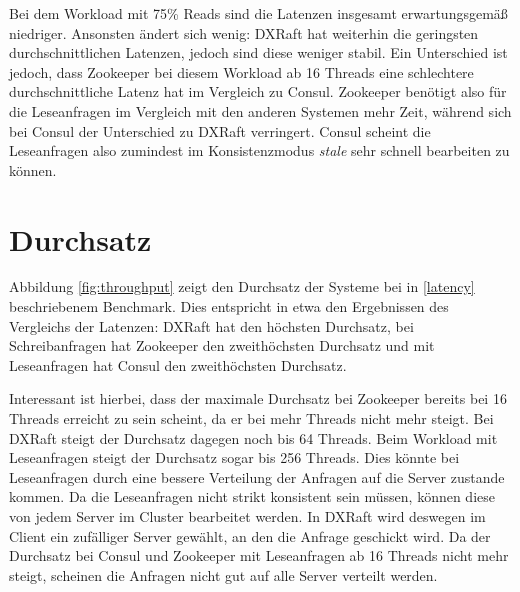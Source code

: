 Bei dem Workload mit 75\% Reads sind die Latenzen insgesamt erwartungsgemäß niedriger. Ansonsten ändert sich wenig: DXRaft hat weiterhin die geringsten durchschnittlichen Latenzen, jedoch sind diese weniger stabil. Ein Unterschied ist jedoch, dass Zookeeper bei diesem Workload ab 16 Threads eine schlechtere durchschnittliche Latenz hat im Vergleich zu Consul. Zookeeper benötigt also für die Leseanfragen im Vergleich mit den anderen Systemen mehr Zeit, während sich bei Consul der Unterschied zu DXRaft verringert. Consul scheint die Leseanfragen also zumindest im Konsistenzmodus \textit{stale} sehr schnell bearbeiten zu können.

\section{Durchsatz}

Abbildung \ref{fig:throughput} zeigt den Durchsatz der Systeme bei in \ref{latency} beschriebenem Benchmark. Dies entspricht in etwa den Ergebnissen des Vergleichs der Latenzen: DXRaft hat den höchsten Durchsatz, bei Schreibanfragen hat Zookeeper den zweithöchsten Durchsatz und mit Leseanfragen hat Consul den zweithöchsten Durchsatz.

Interessant ist hierbei, dass der maximale Durchsatz bei Zookeeper bereits bei 16 Threads erreicht zu sein scheint, da er bei mehr Threads nicht mehr steigt. Bei DXRaft steigt der Durchsatz dagegen noch bis 64 Threads. Beim Workload mit Leseanfragen steigt der Durchsatz sogar bis 256 Threads. Dies könnte bei Leseanfragen durch eine bessere Verteilung der Anfragen auf die Server zustande kommen. Da die Leseanfragen nicht strikt konsistent sein müssen, können diese von jedem Server im Cluster bearbeitet werden. In DXRaft wird deswegen im Client ein zufälliger Server gewählt, an den die Anfrage geschickt wird. Da der Durchsatz bei Consul und Zookeeper mit Leseanfragen ab 16 Threads nicht mehr steigt, scheinen die Anfragen nicht gut auf alle Server verteilt werden.

